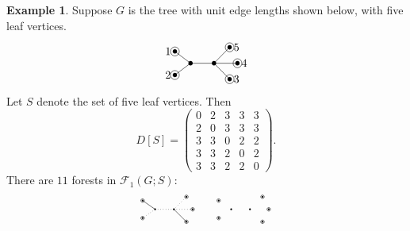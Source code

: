 \documentclass[12pt]{amsart}
\theoremstyle{definition}
\newtheorem{eg}[thm]{Example}
\newcommand{\trees}{\mathcal{F}_1}
\begin{document}
\begin{eg}
Suppose $G$ is the tree with unit edge lengths shown below, with five leaf vertices.
\[
\begin{tikzpicture}[scale=1.0]
	\coordinate (1) at (-1,0.37);
	\coordinate (2) at (-1,-0.37);
	\coordinate (3) at (0.75,-0.5);
	\coordinate (4) at (1,0);
	\coordinate (5) at (0.75,0.5);
	\coordinate (A) at (-0.5,0);
	\coordinate (B) at (0.25,0);
	
	\foreach \c in {1,2,3,4,5,A,B} {
		\fill (\c) circle (2pt);
	}
	\foreach \c in {1,2,3,4,5} {
		\draw (\c) circle (4pt);
	}

	\draw (A) -- (1);
	\draw (A) -- (2);
	\draw (B) -- (3);
	\draw (B) -- (4);
	\draw (B) -- (5);
	\draw (A) -- (B);
	
	\foreach \c/\d in {1/left,2/left,3/right,4/right,5/right} {
		\node[\d=0.2] at (\c) {$\c$};
	}
\end{tikzpicture}
\]
Let $S$ denote the set of five leaf vertices. Then
\[
	D[S] = \begin{pmatrix}
	0 & 2 & 3 & 3 & 3 \\
	2 & 0 & 3 & 3 & 3 \\
	3 & 3 & 0 & 2 & 2 \\
	3 & 3 & 2 & 0 & 2 \\
	3 & 3 & 2 & 2 & 0
	\end{pmatrix}.
\]
There are $11$ forests in $\trees(G;S)$:
\[
\begin{tikzpicture}[scale=0.4]
	\coordinate (1) at (-2,0.7);
	\coordinate (2) at (-2,-0.7);
	\coordinate (3) at (1.5,-1);
	\coordinate (4) at (2,0);
	\coordinate (5) at (1.5,1);
	\coordinate (A) at (-1,0);
	\coordinate (B) at (0.5,0);
	
	\foreach \c in {1,2,3,4,5,A,B} {
		\fill (\c) circle (2pt);
	}
	\foreach \c in {1,2,3,4,5} {
		\draw (\c) circle (4pt);
	}

	\draw (A) -- (1);
	\draw[dotted] (A) -- (2);
	\draw (B) -- (3);
	\draw[dotted] (B) -- (4);
	\draw[dotted] (B) -- (5);
	\draw[dotted] (A) -- (B);
\end{tikzpicture}
\qquad
\begin{tikzpicture}[scale=0.4]
	\coordinate (1) at (-2,0.7);
	\coordinate (2) at (-2,-0.7);
	\coordinate (3) at (1.5,-1);
	\coordinate (4) at (2,0);
	\coordinate (5) at (1.5,1);
	\coordinate (A) at (-1,0);
	\coordinate (B) at (0.5,0);
	
	\foreach \c in {1,2,3,4,5,A,B} {
		\fill (\c) circle (2pt);
	}
	\foreach \c in {1,2,3,4,5} {
		\draw (\c) circle (4pt);
	}


\end{tikzpicture}\]
\end{eg}
\end{document}
